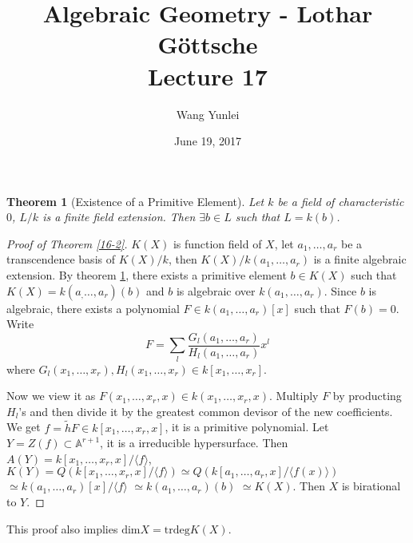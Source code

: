 \documentclass{amsart}
\theoremstyle{plain}
\newtheorem{theorem}{Theorem}
\theoremstyle{definition}
\theoremstyle{remark}
\numberwithin{equation}{section}
\begin{document}
\title[Complete-simple distributive lattices]
{Algebraic Geometry - Lothar G\"{o}ttsche \\
	Lecture 17}
\author{Wang Yunlei}
\date{June 19, 2017}
 
\maketitle
\begin{theorem}[Existence of a Primitive Element]\label{17-1}
	Let $ k $ be a field of characteristic $ 0 $, $ L/k $ is a finite field extension. Then $ \exists b\in L $ such that $ L=k(b) $.
\end{theorem}
\begin{proof}[Proof of Theorem \ref{16-2}]
	$ K(X) $ is function field of $ X $, let $ a_1,\dots,a_r $ be a transcendence basis of $ K(X)/k $, then $ K(X)/k(a_1,\dots,a_r) $ is a finite algebraic extension. By theorem  \ref{17-1}, there exists a primitive element $ b\in K(X) $ such that  $ K(X)=k(a_,\dots,a_r)(b) $ and $ b $ is algebraic over $ k(a_1,\dots,a_r) $. Since $ b $ is algebraic, there exists a polynomial $ F\in k(a_1,\dots,a_r)[x] $ such that $ F(b)=0 $. Write 
	$$
	F=\sum\limits_{l}\frac{G_l(a_1,\dots,a_r)}{H_l(a_1,\dots,a_r)}x^l
	$$
	where $ G_l(x_1,\dots,x_r),H_l(x_1,\dots,x_r)\in k[x_1,\dots,x_r] $. 
	
	Now we view it as $ F(x_1,\dots,x_r,x)\in k(x_1,\dots,x_r,x) $. Multiply $ F $ by producting $ H_l $'s and then  divide it by the greatest common devisor of the new coefficients. We get $ f=\tilde{h}F\in k[x_1,\dots,x_r,x] $, it is a primitive polynomial. Let $ Y=Z(f)\subset \mathbb{A}^{r+1} $, it is a irreducible hypersurface. Then $ A(Y)=k[x_1,\dots,x_r,x]/\langle f\rangle $, $ K(Y)=Q(k[x_1,\dots,x_r,x]/\langle f\rangle)\simeq Q(k[a_1,\dots,a_r,x]/\langle f(x) \rangle) $ $ \simeq k(a_1,\dots,a_r)[x]/\langle f\rangle$ $\simeq k(a_1,\dots,a_r)(b) $ $ \simeq K(X) $. Then $ X $ is birational to $ Y $.
\end{proof}
This proof also implies $ \text{dim}X=\text{trdeg}K(X) $.
\end{document}
